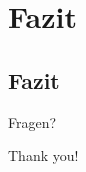 \section{Fazit}
\subsection{Fazit}

\begin{frame}
\Huge
Fragen?
\end{frame}

\begin{frame}
\Huge
Thank you!

\end{frame}

